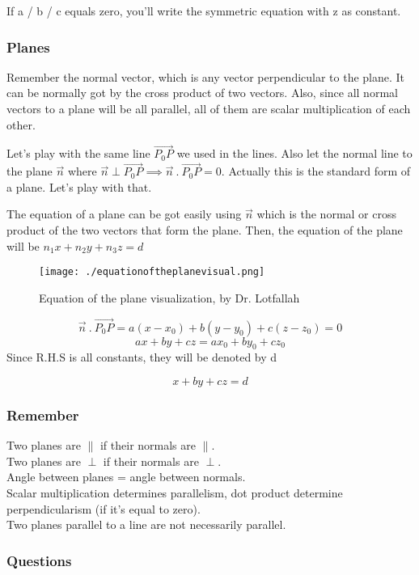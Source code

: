 \documentclass{article}
\begin{document}
If a / b / c equals zero, you'll write the symmetric equation with z as constant.

\newpage
\subsubsection{Planes}
Remember the normal vector, which is any vector perpendicular to the plane. 
It can be normally got by the cross product of two vectors.
Also, since all normal vectors to a plane will be all parallel, all of them are scalar multiplication of each other. 

Let's play with the same line $ \vec{ P_0P} $ we used in the lines. Also let the normal line to the plane $ \vec{ n } $ where $ \vec{ n } \perp \vec{ P_0P } \implies \vec{ n }\ .\ \vec{ P_0P } = 0$. Actually this is the standard form of a plane. Let's play with that.

The equation of a plane can be got easily using  $\vec{n}$ which is the normal or cross product of the two vectors that form the plane. Then, the equation of the plane will be $ n_1 x + n_2 y + n_3 z = d$
\begin{figure}[h]
	\centering
	\texttt{[image: ./equationoftheplanevisual.png]}
	\caption{Equation of the plane visualization, by Dr. Lotfallah}
	\label{fig:lotfalla_plane_1}
\end{figure}
\[
	\vec{ n }\ .\ \vec{ P_0P } = a(x-x_0) + b(y-y_0) + c(z-z_0) = 0 
\]
\[
	ax+by+cz = ax_0+by_0+cz_0	
\]
Since R.H.S is all constants, they will be denoted by d

\[
	x+by+cz = d
\]



\subsubsection{Remember}

Two planes are $ \parallel $ if their normals are $\parallel$. 
\\
Two planes are $ \perp $ if their normals are $\perp$. \\
Angle between planes = angle between normals.
\\
Scalar multiplication determines parallelism, dot product determine perpendicularism (if it's equal to zero).
\\
Two planes parallel to a line are not necessarily parallel.

\newpage
\subsubsection{Questions}
\end{document}
